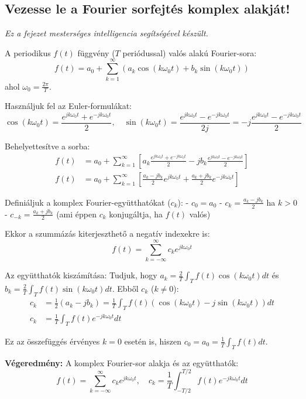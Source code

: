 \subsection{Vezesse le a Fourier sorfejtés komplex alakját!}

\noindent \textit{Ez a fejezet mesterséges intelligencia segítségével készült.}

A periodikus $f(t)$ függvény ($T$ periódussal) valós alakú Fourier-sora:
$$ f(t) = a_0 + \sum_{k=1}^{\infty} \left( a_k \cos(k\omega_0 t) + b_k \sin(k\omega_0 t) \right) $$
ahol $\omega_0 = \frac{2\pi}{T}$.

Használjuk fel az Euler-formulákat:
$$ \cos(k\omega_0 t) = \frac{e^{jk\omega_0 t} + e^{-jk\omega_0 t}}{2}, \quad \sin(k\omega_0 t) = \frac{e^{jk\omega_0 t} - e^{-jk\omega_0 t}}{2j} = -j\frac{e^{jk\omega_0 t} - e^{-jk\omega_0 t}}{2} $$

Behelyettesítve a sorba:
\begin{align*}
    f(t) &= a_0 + \sum_{k=1}^{\infty} \left[ a_k \frac{e^{jk\omega_0 t} + e^{-jk\omega_0 t}}{2} - jb_k \frac{e^{jk\omega_0 t} - e^{-jk\omega_0 t}}{2} \right] \\
    f(t) &= a_0 + \sum_{k=1}^{\infty} \left[ \frac{a_k - jb_k}{2} e^{jk\omega_0 t} + \frac{a_k + jb_k}{2} e^{-jk\omega_0 t} \right]
\end{align*}

Definiáljuk a komplex Fourier-együtthatókat ($c_k$):
- $c_0 = a_0$
- $c_k = \frac{a_k - jb_k}{2}$ ha $k > 0$
- $c_{-k} = \frac{a_k + jb_k}{2}$ (ami éppen $c_k$ konjugáltja, ha $f(t)$ valós)

Ekkor a szummázás kiterjeszthető a negatív indexekre is:
$$ f(t) = \sum_{k=-\infty}^{\infty} c_k e^{jk\omega_0 t} $$

Az együtthatók kiszámítása:
Tudjuk, hogy $a_k = \frac{2}{T} \int_T f(t) \cos(k\omega_0 t) dt$ és $b_k = \frac{2}{T} \int_T f(t) \sin(k\omega_0 t) dt$.
Ebből $c_k$ ($k \neq 0$):
\begin{align*}
    c_k &= \frac{1}{2} (a_k - jb_k) = \frac{1}{T} \int_T f(t) \left( \cos(k\omega_0 t) - j\sin(k\omega_0 t) \right) dt \\
    c_k &= \frac{1}{T} \int_T f(t) e^{-jk\omega_0 t} dt
\end{align*}

Ez az összefüggés érvényes $k=0$ esetén is, hiszen $c_0 = a_0 = \frac{1}{T} \int_T f(t) dt$.

\textbf{Végeredmény:}
A komplex Fourier-sor alakja és az együtthatók:
$$ f(t) = \sum_{k=-\infty}^{\infty} c_k e^{jk\omega_0 t}, \quad c_k = \frac{1}{T} \int_{-T/2}^{T/2} f(t) e^{-jk\omega_0 t} dt $$
